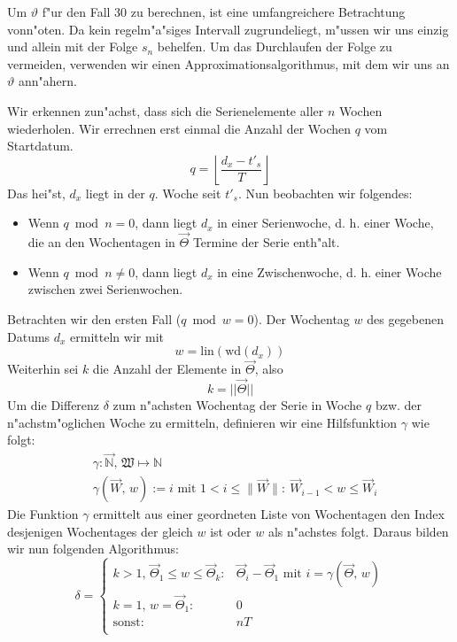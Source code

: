 \documentclass[a4paper]{article}
\newcommand*{\wdf}{\mathrm{wd}}
\newcommand*{\linf}{\mathrm{lin}}
\newcommand*{\wkdays}{\mathfrak{W}}
\numberwithin{equation}{section}
\begin{document}
Um $\vartheta$ f"ur den Fall 30 zu berechnen, ist eine umfangreichere
Betrachtung vonn"oten. Da kein regelm"a"siges Intervall zugrundeliegt, m"ussen
wir uns einzig und allein mit der Folge $s_n$ behelfen. Um das Durchlaufen der
Folge zu vermeiden, verwenden wir einen Approximationsalgorithmus, mit dem wir
uns an $\vartheta$ ann"ahern.

Wir erkennen zun"achst, dass sich die Serienelemente aller $n$ Wochen
wiederholen. Wir errechnen erst einmal die Anzahl der Wochen $q$ vom Startdatum.
\begin{equation}q = \left\lfloor\frac{d_x - t'_s}{T}\right\rfloor\end{equation}
Das hei"st, $d_x$ liegt in der $q$. Woche seit $t'_s$. Nun beobachten wir
folgendes:
\begin{itemize}
  \item Wenn $q \bmod n = 0$, dann liegt $d_x$ in einer Serienwoche, d. h. einer
    Woche, die an den Wochentagen in $\vec{\Theta}$ Termine der Serie enth"alt.
  \item Wenn $q \bmod n \ne 0$, dann liegt $d_x$ in eine Zwischenwoche, d. h.
    einer Woche zwischen zwei Serienwochen.
\end{itemize}

\noindent Betrachten wir den ersten Fall ($q \bmod w = 0$). Der Wochentag $w$
des gegebenen Datums $d_x$ ermitteln wir mit
\begin{equation}w = \linf(\wdf(d_x))\end{equation}
Weiterhin sei $k$ die Anzahl der Elemente in $\vec{\Theta}$, also
\begin{equation}k = ||\vec{\Theta}||\end{equation}
Um die Differenz $\delta$ zum n"achsten Wochentag der Serie in Woche $q$ bzw.
der n"achstm"oglichen Woche zu ermitteln, definieren wir eine Hilfsfunktion
$\gamma$ wie folgt:
\begin{equation}
\begin{split}
  & \gamma : \vec{\mathbb{N}},\,\wkdays \mapsto \mathbb{N} \\
  & \gamma(\vec{W},\,w) := i \textrm{ mit } 1 < i \le \|\vec{W}\| :
    \ \vec{W}_{i-1} < w \le \vec{W}_i
\end{split}
\end{equation}
Die Funktion $\gamma$ ermittelt aus einer geordneten Liste von Wochentagen den
Index desjenigen Wochentages der gleich $w$ ist oder $w$ als n"achstes folgt.
Daraus bilden wir nun folgenden Algorithmus:
\begin{equation}
  \delta = \left\{\begin{array}{ll}
      k > 1,\,\vec{\Theta}_1 \le w \le \vec{\Theta}_k: &
        \vec{\Theta}_i - \vec{\Theta}_{1} \textrm{ mit }
        i = \gamma(\vec{\Theta},\,w) \\
      k = 1,\,w = \vec{\Theta}_1: & 0 \\
      \textrm{sonst}: & nT \\
    \end{array}\right.
\end{equation}
\end{document}
